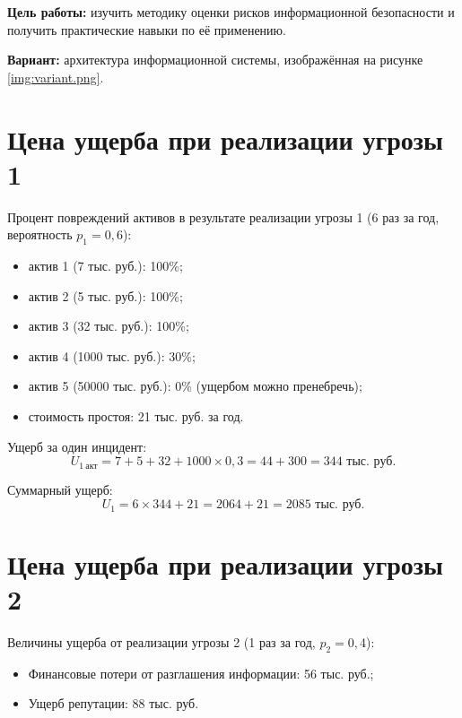 \documentclass{bsuir}
\begin{document}
\maketitle
\mainmatter

\textbf{Цель работы:} изучить методику оценки рисков информационной безопасности и получить
практические навыки по её применению.

\textbf{Вариант:} архитектура информационной системы, изображённая на рисунке \ref{img:variant.png}.


\section{Цена ущерба при реализации угрозы 1}

Процент повреждений активов в результате реализации угрозы 1 (6 раз за год, вероятность $p_1 = 0{,}6$):

\begin{itemize}
	\item актив 1 (7 тыс. руб.): 100\%;
	\item актив 2 (5 тыс. руб.): 100\%;
	\item актив 3 (32 тыс. руб.): 100\%;
	\item актив 4 (1000 тыс. руб.): 30\%;
	\item актив 5 (50000 тыс. руб.): 0\% (ущербом можно пренебречь);
	\item стоимость простоя: 21 тыс. руб. за год.
\end{itemize}

Ущерб за один инцидент:
$$U_{1~\text{акт}} = 7 + 5 + 32 + 1000 \times 0{,}3 = 44 + 300 = 344\text{ тыс.~руб}.$$

Суммарный ущерб:
$$U_1 = 6 \times 344 + 21 = 2064 + 21 = 2085\text{ тыс.~руб}.$$

\section{Цена ущерба при реализации угрозы 2}

Величины ущерба от реализации угрозы 2 (1 раз за год, $p_2 = 0{,}4$):

\begin{itemize}
	\item Финансовые потери от разглашения информации: 56 тыс. руб.;
	\item Ущерб репутации: 88 тыс. руб.
\end{itemize}
\end{document}
